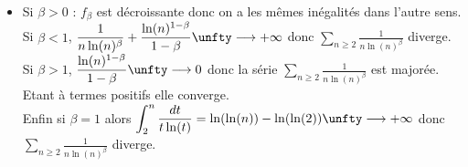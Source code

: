 \documentclass{book}
\begin{document}
\begin{itemize}
\begin{itemize}[label=\textbullet]
			Donc comme $\dfrac{\ln(n)^{1-\beta}}{1-\beta}\unfty\longrightarrow+\infty$, $\displaystyle\sum_{n\geq 2}\frac{1}{n\ln(n)^\beta}$ diverge;
			\item Si $\beta>0$ : $f_\beta$ est décroissante donc on a les mêmes inégalités dans l'autre sens.\\
			Si $\beta<1$, $\dfrac{1}{n\ln(n)^\beta}+\dfrac{\ln(n)^{1-\beta}}{1-\beta}\unfty\longrightarrow+\infty$ donc $\displaystyle\sum_{n\geq 2}\frac{1}{n\ln(n)^\beta}$ diverge.\\
			Si $\beta>1$, $\dfrac{\ln(n)^{1-\beta}}{1-\beta}\unfty\longrightarrow0$ donc la série $\displaystyle\sum_{n\geq 2}\frac{1}{n\ln(n)^\beta}$ est majorée. Etant à termes positifs elle converge.\\
			Enfin si $\beta=1$ alors $\displaystyle\int_2^n\frac{dt}{t\ln(t)}=\ln(\ln(n))-\ln(\ln(2))\unfty\longrightarrow+\infty$ donc $\displaystyle\sum_{n\geq 2}\frac{1}{n\ln(n)^\beta}$ diverge.
		\end{itemize}
	\end{itemize}
	
\end{document}
